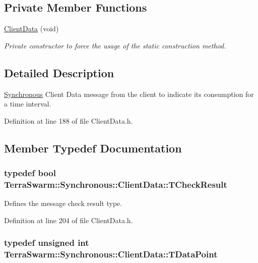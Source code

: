 \subsection*{Private Member Functions}
\begin{DoxyCompactItemize}
\item 
\hyperlink{class_terra_swarm_1_1_synchronous_1_1_client_data_a55b91e768e21a3e176ed03b504182ca3}{Client\-Data} (void)
\begin{DoxyCompactList}\small\item\em Private constructor to force the usage of the static construction method. \end{DoxyCompactList}\end{DoxyCompactItemize}


\subsection{Detailed Description}
\hyperlink{namespace_terra_swarm_1_1_synchronous}{Synchronous} Client Data message from the client to indicate its consumption for a time interval. 

Definition at line 188 of file Client\-Data.\-h.



\subsection{Member Typedef Documentation}
\hypertarget{class_terra_swarm_1_1_synchronous_1_1_client_data_a2a4af9153f7e8fe6cadba6a188ce2207}{
\subsubsection[{T\-Check\-Result}]{\setlength{\rightskip}{0pt plus 5cm}typedef bool {\bf Terra\-Swarm\-::\-Synchronous\-::\-Client\-Data\-::\-T\-Check\-Result}}}\label{class_terra_swarm_1_1_synchronous_1_1_client_data_a2a4af9153f7e8fe6cadba6a188ce2207}


Defines the message check result type. 



Definition at line 204 of file Client\-Data.\-h.

\hypertarget{class_terra_swarm_1_1_synchronous_1_1_client_data_a6c581f1f80217390ea8fe95136c60f07}{
\subsubsection[{T\-Data\-Point}]{\setlength{\rightskip}{0pt plus 5cm}typedef unsigned int {\bf Terra\-Swarm\-::\-Synchronous\-::\-Client\-Data\-::\-T\-Data\-Point}}}\label{class_terra_swarm_1_1_synchronous_1_1_client_data_a6c581f1f80217390ea8fe95136c60f07}


